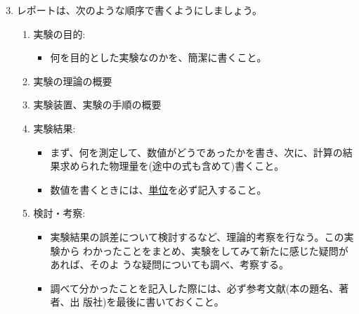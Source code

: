 \begin{enumerate}
\setcounter{enumi}{2}
\item レポートは、次のような順序で書くようにしましょう。

\begin{enumerate}

\item 実験の目的:
\begin{itemize}
\item 何を目的とした実験なのかを、簡潔に書くこと。
\end{itemize}

\item 実験の理論の概要

\item 実験装置、実験の手順の概要

\item 実験結果:
\begin{itemize}
\item まず、何を測定して、数値がどうであったかを書き、次に、計算の結果求められた物理量を(途中の式も含めて)書くこと。
\item 数値を書くときには、\underline{単位}を必ず記入すること。
\end{itemize}

\item 検討・考察:

\begin{itemize}
\item 実験結果の誤差について検討するなど、理論的考察を行なう。この実験から
わかったことをまとめ、実験をしてみて新たに感じた疑問があれば、そのよ
うな疑問についても調べ、考察する。
\item 調べて分かったことを記入した際には、必ず参考文献(本の題名、著者、出
版社)を最後に書いておくこと。
\end{itemize}


\end{enumerate}

\end{enumerate}

